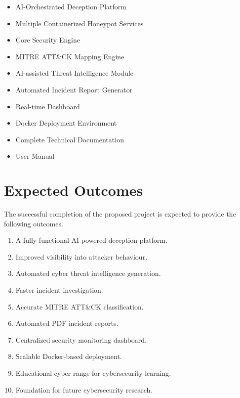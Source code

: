 \documentclass[12pt,a4paper]{report}
\begin{document}
\begin{itemize}
\item AI-Orchestrated Deception Platform
\item Multiple Containerized Honeypot Services
\item Core Security Engine
\item MITRE ATT\&CK Mapping Engine
\item AI-assisted Threat Intelligence Module
\item Automated Incident Report Generator
\item Real-time Dashboard
\item Docker Deployment Environment
\item Complete Technical Documentation
\item User Manual
\end{itemize}


\chapter{Expected Outcomes}

The successful completion of the proposed project is expected to provide the following outcomes.

\begin{enumerate}
\item A fully functional AI-powered deception platform.
\item Improved visibility into attacker behaviour.
\item Automated cyber threat intelligence generation.
\item Faster incident investigation.
\item Accurate MITRE ATT\&CK classification.
\item Automated PDF incident reports.
\item Centralized security monitoring dashboard.
\item Scalable Docker-based deployment.
\item Educational cyber range for cybersecurity learning.
\item Foundation for future cybersecurity research.
\end{enumerate}
\end{document}
